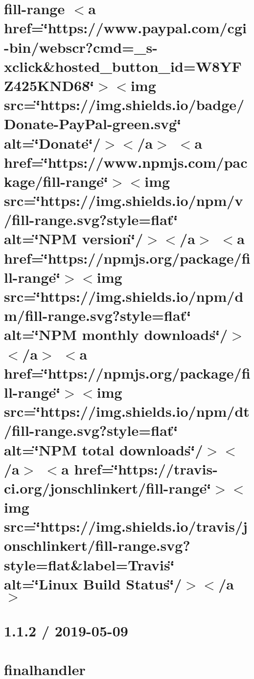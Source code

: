 \let\mypdfximage\pdfximage\def\pdfximage{\immediate\mypdfximage}\documentclass[twoside]{book}
\newcommand{\+}{\discretionary{\mbox{\scriptsize$\hookleftarrow$}}{}{}}
\begin{document}
\chapter{fill-\/range $<$a href=\char`\"{}https\+://www.\+paypal.\+com/cgi-\/bin/webscr?cmd=\+\_\+s-\/xclick\&hosted\+\_\+button\+\_\+id=\+W8\+Y\+F\+Z425\+K\+N\+D68\char`\"{}$>$$<$img src=\char`\"{}https\+://img.\+shields.\+io/badge/\+Donate-\/\+Pay\+Pal-\/green.\+svg\char`\"{} alt=\char`\"{}\+Donate\char`\"{}/$>$$<$/a$>$ $<$a href=\char`\"{}https\+://www.\+npmjs.\+com/package/fill-\/range\char`\"{}$>$$<$img src=\char`\"{}https\+://img.\+shields.\+io/npm/v/fill-\/range.\+svg?style=flat\char`\"{} alt=\char`\"{}\+N\+P\+M version\char`\"{}/$>$$<$/a$>$ $<$a href=\char`\"{}https\+://npmjs.\+org/package/fill-\/range\char`\"{}$>$$<$img src=\char`\"{}https\+://img.\+shields.\+io/npm/dm/fill-\/range.\+svg?style=flat\char`\"{} alt=\char`\"{}\+N\+P\+M monthly downloads\char`\"{}/$>$$<$/a$>$ $<$a href=\char`\"{}https\+://npmjs.\+org/package/fill-\/range\char`\"{}$>$$<$img src=\char`\"{}https\+://img.\+shields.\+io/npm/dt/fill-\/range.\+svg?style=flat\char`\"{} alt=\char`\"{}\+N\+P\+M total downloads\char`\"{}/$>$$<$/a$>$ $<$a href=\char`\"{}https\+://travis-\/ci.\+org/jonschlinkert/fill-\/range\char`\"{}$>$$<$img src=\char`\"{}https\+://img.\+shields.\+io/travis/jonschlinkert/fill-\/range.\+svg?style=flat\&label=\+Travis\char`\"{} alt=\char`\"{}\+Linux Build Status\char`\"{}/$>$$<$/a$>$}
\label{md__c_1__git_hub__p_r_o_y_e_c_t_o-_i_i_i-_g_o_t_rest-api_node_modules_fill-range__r_e_a_d_m_e}

\chapter{1.1.2 / 2019-\/05-\/09}
\label{md__c_1__git_hub__p_r_o_y_e_c_t_o-_i_i_i-_g_o_t_rest-api_node_modules_finalhandler__h_i_s_t_o_r_y}

\chapter{finalhandler}
\label{md__c_1__git_hub__p_r_o_y_e_c_t_o-_i_i_i-_g_o_t_rest-api_node_modules_finalhandler__r_e_a_d_m_e}

\end{document}
